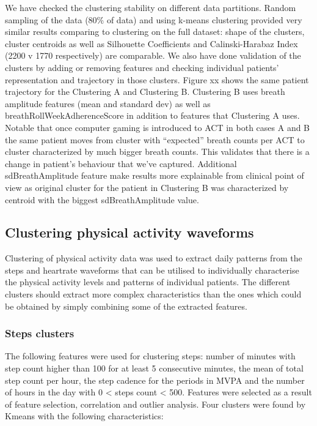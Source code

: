 \documentclass{article}
\begin{document}
We have checked the clustering stability on different data partitions.  Random sampling of the data (80\% of data) and using k-means clustering provided very similar results comparing to clustering on the full dataset:  shape of the clusters, cluster centroids as well as Silhouette Coefficients and Calinski-Harabaz Index  (2200 v 1770 respectively) are comparable. 
We also have done validation of the clusters by adding or removing features and checking individual patients’ representation and trajectory in those clusters. Figure xx shows the same patient trajectory for the Clustering A and Clustering B. Clustering B uses breath amplitude features (mean and standard dev) as well as breathRollWeekAdherenceScore in addition to features that Clustering A uses. Notable that  once computer gaming is introduced to ACT in both cases A and B the same patient moves from cluster with “expected” breath counts per ACT to cluster characterized by much bigger breath counts. This validates that there is a change in patient’s behaviour that we’ve captured. Additional sdBreathAmplitude feature make results more explainable from clinical point of view as original cluster for the patient in Clustering B was characterized by centroid with the biggest sdBreathAmplitude value. 

\subsection{Clustering physical activity waveforms} 

Clustering of physical activity data was used to extract daily patterns from the steps and heartrate waveforms that can be utilised to individually characterise the physical activity levels and patterns of individual patients. The different clusters should extract more complex characteristics than the ones which could be obtained by simply combining some of the extracted features. 

\subsubsection{Steps clusters}

The following features were used for clustering steps: number of minutes with step count higher than 100 for at least 5 consecutive minutes, the mean of total step count per hour, the step cadence for the periods in MVPA and the number of hours in the day with 0 < steps count < 500. Features were selected as a result of feature selection, correlation and outlier analysis. Four clusters were found by Kmeans with the following characteristics: 
\end{document}
